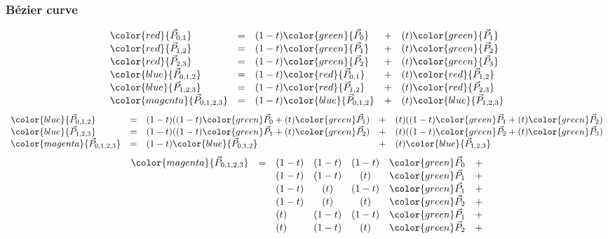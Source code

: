 \begin{frame}
\frametitle{Bézier curve}
  {\tiny
  \[
  \begin{array}{lclcl}
    \color{red}    {\vec{P}_{0,1}    } &=& (1-t)\color{green}{\vec{P}_0      } &+& (t)\color{green}{\vec{P}_1      } \\
    \color{red}    {\vec{P}_{1,2}    } &=& (1-t)\color{green}{\vec{P}_1      } &+& (t)\color{green}{\vec{P}_2      } \\
    \color{red}    {\vec{P}_{2,3}    } &=& (1-t)\color{green}{\vec{P}_2      } &+& (t)\color{green}{\vec{P}_3      } \\
    \color{blue}   {\vec{P}_{0,1,2}  } &=& (1-t)\color{red}  {\vec{P}_{0,1}  } &+& (t)\color{red}  {\vec{P}_{1,2}  } \\
    \color{blue}   {\vec{P}_{1,2,3}  } &=& (1-t)\color{red}  {\vec{P}_{1,2}  } &+& (t)\color{red}  {\vec{P}_{2,3}  } \\
    \color{magenta}{\vec{P}_{0,1,2,3}} &=& (1-t)\color{blue} {\vec{P}_{0,1,2}} &+& (t)\color{blue} {\vec{P}_{1,2,3}} 
  \end{array}
  \]
  }
  {\tiny
  \[
  \begin{array}{lclcl}
    \color{blue}   {\vec{P}_{0,1,2}  } &=& (1-t)((1-t){\color{green}\vec{P}_0} + (t){\color{green}\vec{P}_1}) &+& (t)((1-t){\color{green}\vec{P}_1} + (t){\color{green}\vec{P}_2}) \\
    \color{blue}   {\vec{P}_{1,2,3}  } &=& (1-t)((1-t){\color{green}\vec{P}_1} + (t){\color{green}\vec{P}_2}) &+& (t)((1-t){\color{green}\vec{P}_2} + (t){\color{green}\vec{P}_3}) \\
    \color{magenta}{\vec{P}_{0,1,2,3}} &=& (1-t)\color{blue} {\vec{P}_{0,1,2}} &+& (t)\color{blue} {\vec{P}_{1,2,3}} 
  \end{array}
  \]
  }
  {\tiny
  \[
  \begin{array}{lclccrc}
    \color{magenta}{\vec{P}_{0,1,2,3}} &=& (1-t)&(1-t)&(1-t)&{\color{green}\vec{P}_0} &+ \\
                                       & & (1-t)&(1-t)&(  t)&{\color{green}\vec{P}_1} &+ \\
                                       & & (1-t)&(  t)&(1-t)&{\color{green}\vec{P}_1} &+ \\
                                       & & (1-t)&(  t)&(  t)&{\color{green}\vec{P}_2} &+ \\
                                       & & (  t)&(1-t)&(1-t)&{\color{green}\vec{P}_1} &+ \\
                                       & & (  t)&(1-t)&(  t)&{\color{green}\vec{P}_2} &+ \\

\end{array}\]}
\end{frame}
